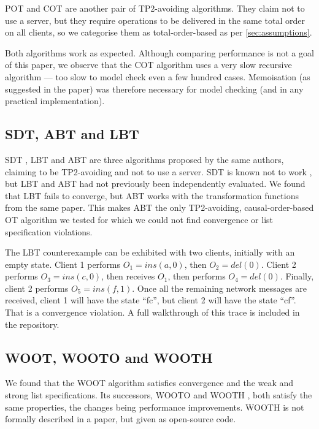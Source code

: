 \documentclass[sigplan,10pt,review,anonymous]{acmart}
\begin{document}
POT \cite{Xu2016} and COT \cite{Sun2009} are another pair of TP2-avoiding algorithms. They claim not to use a server, but they require operations to be delivered in the same total order on all clients, so we categorise them as total-order-based as per \autoref{sec:assumptions}.

Both algorithms work as expected. Although comparing performance is not a goal of this paper, we observe that the COT algorithm uses a very slow recursive algorithm --- too slow to model check even a few hundred cases. Memoisation (as suggested in the paper) was therefore necessary for model checking (and in any practical implementation).

\subsection{SDT, ABT and LBT}

SDT \cite{Li2004CSCW}, LBT \cite{Li2005} and ABT \cite{Li2010} are three algorithms proposed by the same authors, claiming to be TP2-avoiding and not to use a server. SDT is known not to work \cite{Oster2005Proving}, but LBT and ABT had not previously been independently evaluated. We found that LBT fails to converge, but ABT works with the transformation functions from the same paper. This makes ABT the only TP2-avoiding, causal-order-based OT algorithm we tested for which we could not find convergence or list specification violations. 

The LBT counterexample can be exhibited with two clients, initially with an empty state. Client 1 performs $O_1 = \mathit{ins}(a,0)$, then $O_2 = \mathit{del}(0)$.
Client 2 performs $O_3 = \mathit{ins}(c,0)$, then receives $O_1$, then performs $O_4=\mathit{del}(0)$. Finally, client 2 performs $O_5 = \mathit{ins}(f,1)$. Once all the remaining network messages are received, client 1 will have the state ``fc'', but client 2 will have the state ``cf''. That is a convergence violation. A full walkthrough of this trace is included in the repository.

\subsection{WOOT, WOOTO and WOOTH}

We found that the WOOT \cite{Oster2006WOOT} algorithm satisfies convergence and the weak and strong list specifications. Its successors, WOOTO \cite{Weiss2007} and WOOTH \cite{AhmedNacer2011}, both satisfy the same properties, the changes being performance improvements. WOOTH is not formally described in a paper, but given as open-source code.
\end{document}
